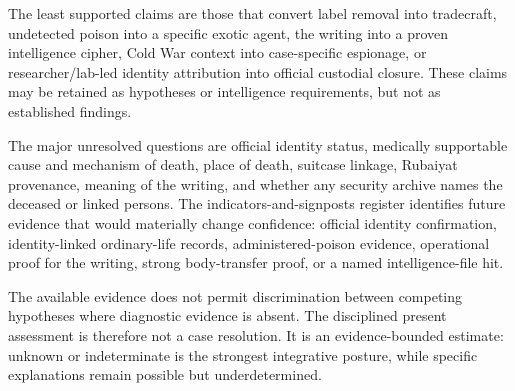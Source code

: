 The least supported claims are those that convert label removal into tradecraft, undetected poison into a specific exotic agent, the writing into a proven intelligence cipher, Cold War context into case-specific espionage, or researcher/lab-led identity attribution into official custodial closure. These claims may be retained as hypotheses or intelligence requirements, but not as established findings.

The major unresolved questions are official identity status, medically supportable cause and mechanism of death, place of death, suitcase linkage, Rubaiyat provenance, meaning of the writing, and whether any security archive names the deceased or linked persons. The indicators-and-signposts register identifies future evidence that would materially change confidence: official identity confirmation, identity-linked ordinary-life records, administered-poison evidence, operational proof for the writing, strong body-transfer proof, or a named intelligence-file hit.

The available evidence does not permit discrimination between competing hypotheses where diagnostic evidence is absent. The disciplined present assessment is therefore not a case resolution. It is an evidence-bounded estimate: unknown or indeterminate is the strongest integrative posture, while specific explanations remain possible but underdetermined.
